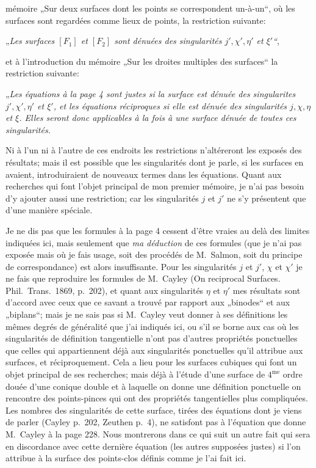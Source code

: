 \documentclass{article}
\begin{document}
mémoire „Sur deux surfaces dont les points se correspondent un-à-un“, où les surfaces sont regardées comme lieux de points, la restriction suivante:

„\emph{Les surfaces $[F_1]$ et $[F_2]$ sont dénuées des singularités $j', \chi', \eta'$ et $\xi'$“},

et à l'introduction du mémoire „Sur les droites multiples des surfaces“ la restriction suivante:

„\emph{Les équations à la page 4 sont justes si la surface est dénuée des singularites $j', \chi', \eta'$ et $\xi'$, et les équations réciproques si elle est dénuée des singularités $j, \chi, \eta$ et $\xi$. Elles seront donc applicables à la fois à une surface dénuée de toutes ces singularités.}

Ni à l'un ni à l'autre de ces endroits les restrictions n'altéreront les exposés des résultats; mais il est possible que les singularités dont je parle, si les surfaces en avaient, introduiraient de nouveaux termes dans les équations. Quant aux recherches qui font l'objet principal de mon premier mémoire, je n'ai pas besoin d'y ajouter aussi une restriction; car les singularités $j$ et $j'$ ne s'y présentent que d'une manière spéciale.

Je ne dis pas que les formules à la page 4 cessent d'être vraies au delà des limites indiquées ici, mais seulement que \emph{ma déduction} de ces formules (que je n'ai pas exposée mais où je fais usage, soit des procédés de M.~Salmon, soit du principe de correspondance) est alors insuffisante. Pour les singularités $j$ et $j'$, $\chi$ et $\chi'$ je ne fais que reproduire les formules de M.~Cayley (On reciprocal Surfaces. Phil.\ Trans.\ 1869, p.~202), et quant aux singularités $\eta$ et $\eta'$ mes résultats sont d'accord avec ceux que ce savant a trouvé par rapport aux „binodes“ et aux „biplans“; mais je ne sais pas si M.~Cayley veut donner à ses définitions les mêmes degrés de généralité que j'ai indiqués ici, ou s'il se borne aux cas où les singularités de définition tangentielle n'ont pas d'autres propriétés ponctuelles que celles qui appartiennent déjà aux singularités ponctuelles qu'il attribue aux surfaces, et réciproquement. Cela a lieu pour les surfaces cubiques qui font un objet principal de ses recherches; mais déjà à l'étude d'une surface de $4^{\text{me}}$ ordre douée d'une conique double et à laquelle on donne une définition ponctuelle on rencontre des points-pinces qui ont des propriétés tangentielles plus compliquées. Les nombres des singularités de cette surface, tirées des équations dont je viens de parler (Cayley p.~202, Zeuthen p.~4), ne satisfont pas à l'équation que donne M.~Cayley à la page 228. Nous montrerons dans ce qui suit un autre fait qui sera en discordance avec cette dernière équation (les autres supposées justes) si l'on attribue à la surface des points-clos définis comme je l'ai fait ici.
\end{document}
